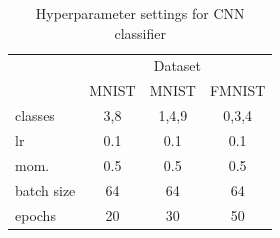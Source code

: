 \begin{table}[h]
\begin{minipage}{0.45\linewidth}
      \centering
      \caption{Hyperparameter settings for CNN classifier}\label{tab:hyperparameter_cnn}
      \begin{tabular}{l |c c c}
       \toprule
       \multicolumn{1}{c}{} & \multicolumn{3}{|c}{Dataset}\\
       \cline{2-4}
        \multicolumn{1}{c}{ }&\multicolumn{1}{|c}{MNIST}  & \multicolumn{1}{c}{MNIST}  & \multicolumn{1}{c}{FMNIST} \\
       \midrule
        {\tiny classes} & 3,8 & 1,4,9 & 0,3,4\\ 
        lr &  0.1 & 0.1 & 0.1\\
        mom. &   0.5& 0.5& 0.5\\
        {\tiny batch size} &  64& 64&64\\
        epochs &  20 & 30 & 50 \\
      \bottomrule
      \end{tabular}
    \end{minipage}
\end{table}

\newpage

